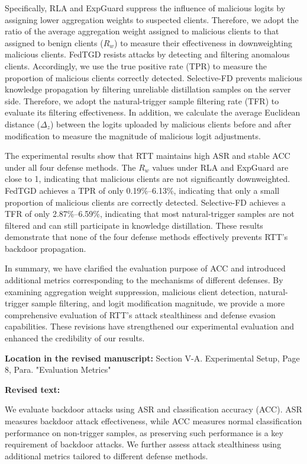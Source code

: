 \documentclass[11pt,a4paper]{article}
\newcommand{\manualindent}{\par\noindent\hspace*{1.5em}\ignorespaces}
\newcommand{\revisedtext}[2]{%
  {\bfseries\color{headingnavy}Location in the revised manuscript:} #1\par
  \begin{tcolorbox}[
      enhanced,breakable,colback=replyblue!3,colframe=replyblue!18,
      before upper={\setlength{\parskip}{6pt}},
      borderline west={2.5pt}{0pt}{replyblue},
      boxrule=0.5pt,arc=1mm,left=11pt,right=9pt,top=8pt,bottom=8pt]
    {\bfseries\color{headingnavy}Revised text:}\par
    #2
  \end{tcolorbox}
  \vspace{0.35em}%
}
\begin{document}
{\manualindent Specifically, RLA and ExpGuard suppress the influence of malicious logits by assigning lower aggregation weights to suspected clients.
Therefore, we adopt the ratio of the average aggregation weight assigned to malicious clients to that assigned to benign clients ($R_w$) to measure their effectiveness in downweighting malicious clients.
FedTGD resists attacks by detecting and filtering anomalous clients.
Accordingly, we use the true positive rate (TPR) to measure the proportion of malicious clients correctly detected.
Selective-FD prevents malicious knowledge propagation by filtering unreliable distillation samples on the server side.
Therefore, we adopt the natural-trigger sample filtering rate (TFR) to evaluate its filtering effectiveness.
In addition, we calculate the average Euclidean distance ($\Delta_z$) between the logits uploaded by malicious clients before and after modification to measure the magnitude of malicious logit adjustments.

\manualindent The experimental results show that RTT maintains high ASR and stable ACC under all four defense methods.
The $R_w$ values under RLA and ExpGuard are close to 1, indicating that malicious clients are not significantly downweighted.
FedTGD achieves a TPR of only 0.19\%--6.13\%, indicating that only a small proportion of malicious clients are correctly detected.
Selective-FD achieves a TFR of only 2.87\%--6.59\%, indicating that most natural-trigger samples are not filtered and can still participate in knowledge distillation.
These results demonstrate that none of the four defense methods effectively prevents RTT's backdoor propagation.

\manualindent In summary, we have clarified the evaluation purpose of ACC and introduced additional metrics corresponding to the mechanisms of different defenses.
By examining aggregation weight suppression, malicious client detection, natural-trigger sample filtering, and logit modification magnitude, we provide a more comprehensive evaluation of RTT's attack stealthiness and defense evasion capabilities.
These revisions have strengthened our experimental evaluation and enhanced the credibility of our results.}

\revisedtext{Section V-A. Experimental Setup, Page 8, Para. "Evaluation Metrics"}{\manualindent We evaluate backdoor attacks using ASR and classification accuracy (ACC).
ASR measures backdoor attack effectiveness, while ACC measures normal classification performance on non-trigger samples, as preserving such performance is a key requirement of backdoor attacks.
We further assess attack stealthiness using additional metrics tailored to different defense methods.}
\end{document}
